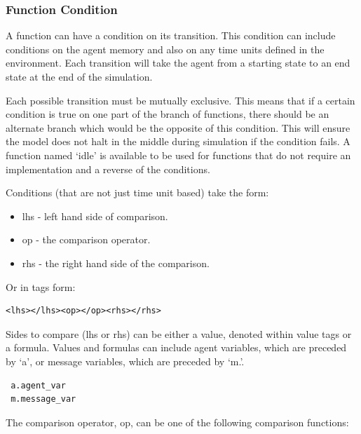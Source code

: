 \documentclass[a4paper,11pt]{article}
\newenvironment{mylisting}
{\begin{list}{}{\setlength{\leftmargin}{1em}}\item\small\bfseries}
{\end{list}}
\begin{document}
\subsubsection{Function Condition}
\label{functioncond}

A function can have a condition on its transition. This condition
can include conditions on the agent memory and also on any time
units defined in the environment. Each transition will take the
agent from a starting state to an end state at the end of the
simulation.

Each possible transition must be mutually exclusive. This means that
if a certain condition is true on one part of the branch of
functions, there should be an alternate branch which would be the
opposite of this condition. This will ensure the model does not halt
in the middle during simulation if the condition fails. A function
named `idle' is available to be used for functions that do not
require an implementation and a reverse of the conditions.

Conditions (that are not just time unit based) take the form:

\begin{itemize}
  \item lhs - left hand side of comparison.
  \item op - the comparison operator.
  \item rhs - the right hand side of the comparison.
\end{itemize}

Or in tags form:

\begin{mylisting}
\begin{verbatim}
<lhs></lhs><op></op><rhs></rhs>
\end{verbatim}
\end{mylisting}

Sides to compare (lhs or rhs) can be either a value, denoted within
value tags or a formula. Values and formulas can include agent
variables, which are preceded by `a', or message variables, which
are preceded by `m.'.

 \begin{mylisting}
 \begin{verbatim}
 a.agent_var
 m.message_var
 \end{verbatim}
 \end{mylisting}

The comparison operator, op, can be one of the following comparison
functions:
\end{document}

